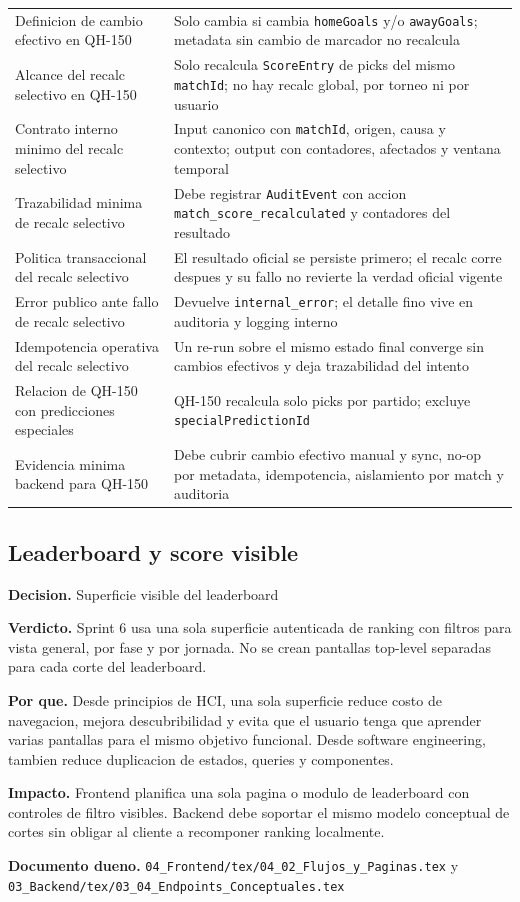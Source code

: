 \begin{longtable}{p{}p{}}
Definicion de cambio efectivo en QH-150 & Solo cambia si cambia \texttt{homeGoals} y/o \texttt{awayGoals}; metadata sin cambio de marcador no recalcula \\
Alcance del recalc selectivo en QH-150 & Solo recalcula \texttt{ScoreEntry} de picks del mismo \texttt{matchId}; no hay recalc global, por torneo ni por usuario \\
Contrato interno minimo del recalc selectivo & Input canonico con \texttt{matchId}, origen, causa y contexto; output con contadores, afectados y ventana temporal \\
Trazabilidad minima de recalc selectivo & Debe registrar \texttt{AuditEvent} con accion \texttt{match\_score\_recalculated} y contadores del resultado \\
Politica transaccional del recalc selectivo & El resultado oficial se persiste primero; el recalc corre despues y su fallo no revierte la verdad oficial vigente \\
Error publico ante fallo de recalc selectivo & Devuelve \texttt{internal\_error}; el detalle fino vive en auditoria y logging interno \\
Idempotencia operativa del recalc selectivo & Un re-run sobre el mismo estado final converge sin cambios efectivos y deja trazabilidad del intento \\
Relacion de QH-150 con predicciones especiales & QH-150 recalcula solo picks por partido; excluye \texttt{specialPredictionId} \\
Evidencia minima backend para QH-150 & Debe cubrir cambio efectivo manual y sync, no-op por metadata, idempotencia, aislamiento por match y auditoria \\
\bottomrule
\end{longtable}

\subsection{Leaderboard y score visible}

\begin{docnote}
\textbf{Decision.} Superficie visible del leaderboard

\textbf{Verdicto.} Sprint 6 usa una sola superficie autenticada de ranking con filtros para vista general, por fase y por jornada. No se crean pantallas top-level separadas para cada corte del leaderboard.

\textbf{Por que.} Desde principios de HCI, una sola superficie reduce costo de navegacion, mejora descubribilidad y evita que el usuario tenga que aprender varias pantallas para el mismo objetivo funcional. Desde software engineering, tambien reduce duplicacion de estados, queries y componentes.

\textbf{Impacto.} Frontend planifica una sola pagina o modulo de leaderboard con controles de filtro visibles. Backend debe soportar el mismo modelo conceptual de cortes sin obligar al cliente a recomponer ranking localmente.

\textbf{Documento dueno.} \texttt{04\_Frontend/tex/04\_02\_Flujos\_y\_Paginas.tex} y \texttt{03\_Backend/tex/03\_04\_Endpoints\_Conceptuales.tex}
\end{docnote}


